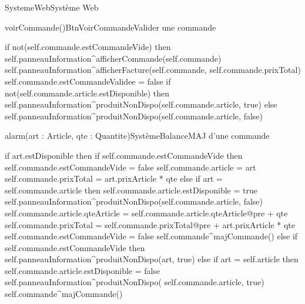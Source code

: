 \begin{OM}{SystemeWeb}{Système Web}
    \begin{OMOperation}{voirCommande()}{BtnVoirCommande}{Valider une commande}
        \begin{OMMessages}
        \end{OMMessages}
        \OMNoPre
        \begin{OMPost}
if not(self.commande.estCommandeVide) then
    self.panneauInformation^afficherCommande(self.commande)
    self.panneauInformation^afficherFacture(self.commande, self.commande.prixTotal)
    self.commande.estCommandeValidee = false
    if not(self.commande.article.estDisponible) then
        self.panneauInformation^produitNonDispo(self.commande.article, true)
    else
        self.panneauInformation^produitNonDispo(self.commande.article, false)
        \end{OMPost}
    \end{OMOperation}

    \begin{OMOperation}{alarm(art : Article, qte : Quantite)}{SystèmeBalance}{MAJ d'une commande}
        \begin{OMMessages}
        \end{OMMessages}
        \OMNoPre
        \begin{OMPost}
if art.estDisponible then
    if self.commande.estCommandeVide then
        self.commande.estCommandeVide = false
        self.commande.article = art
        self.commande.prixTotal = art.prixArticle * qte
    else
        if art = self.commande.article then
            self.commande.article.estDisponible = true
            self.panneauInformation^produitNonDispo(self.commande.article, false)
            self.commande.article.qteArticle =
            self.commande.article.qteArticle@pre + qte
            self.commande.prixTotal = self.commande.prixTotal@pre +
            art.prixArticle * qte
            self.commande.estCommandeVide = false
            self.commande^majCommande()
else
    if self.commande.estCommandeVide then
        self.panneauInformation^produitNonDispo(art, true)
    else
        if art = self.article then
        self.commande.article.estDisponible = false
        self.panneauInformation^produitNonDispo(
        self.commande.article, true)
        self.commande^majCommande()
        \end{OMPost}
    \end{OMOperation}


\end{OM}
